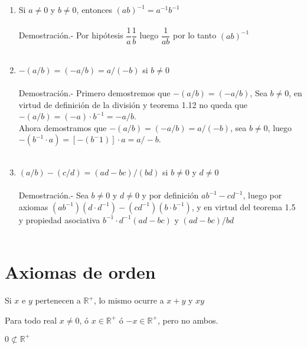 \begin{enumerate}[\bfseries 1.]
\item Si $a\neq 0$ y $b\neq 0$, entonces $(ab)^{-1} = a^{-1} b^{-1}$\\\\
Demostración.- \; Por hipótesis $\dfrac{1}{a} \dfrac{1}{b}$ luego $\dfrac{1}{ab}$ por lo tanto $(ab)^{-1}$\\\\

\item $-(a/b)=(-a/b)=a/(-b)$ si $b\neq 0$\\\\
Demostración.- \;
Primero demostremos que $-(a/b)=(-a/b)$, Sea $b\neq 0$, en virtud de definición de la división y teorema 1.12 no queda que $-(a/b)=(-a)\cdot b^{-1}=-a/b$.\\
Ahora demostramos que $-(a/b)=(-a/b)=a/(-b)$, sea $b\neq0$, luego $-(b^{-1}\cdot a)=\left[-(b^-1)\right]\cdot a = a/-b$. \\\\

\item $(a/b)-(c/d)=(ad-bc)/(bd)$ si $b\neq 0$ y $d\neq 0$\\\\
Demostración.- \;
Sea $b\neq 0$ y $d\neq 0$ y por definición $ab^{-1}-cd^{-1}$, luego por axiomas $(ab^{-1})(d\cdot d^{-1})-(cd^{-1})(b\cdot b^{-1})$, y en virtud del teorema 1.5 y propiedad asociativa $b^{-1}\cdot d^{-1}(ad-bc)$ y $(ad-bc)/bd$\\\\
\end{enumerate}

\section{Axiomas de orden}
\begin{axioma}Si $x$ e $y$ pertenecen a $\mathbb{R}^+$, lo mismo ocurre a $x+y$ y $xy$\\
\end{axioma}
\begin{axioma}
Para todo real $x\neq 0$, ó $x \in \mathbb{R}^+$ ó $-x \in \mathbb{R}^+$, pero no ambos.\\
\end{axioma}
\begin{axioma}
$0 \not\subset \mathbb{R}^+$\\
\end{axioma}

